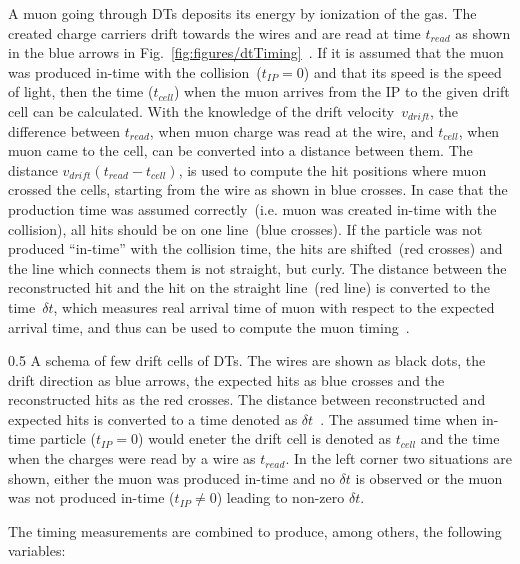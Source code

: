 A muon going through DTs deposits its energy by ionization of the gas. The created charge carriers drift towards the wires and are read at time $t_{read}$ as shown in the blue arrows in Fig.~\ref{fig:figures/dtTiming}~\cite{Traczyk:1365029}. If it is assumed that the muon was produced in-time with the collision~($t_{IP} = 0$) and that its speed is the speed of light, then the time ($t_{cell}$) when the muon arrives from the IP to the given drift cell can be calculated. With the knowledge of the drift velocity~$v_{drift}$, the difference between $t_{read}$, when muon charge was read at the wire, and $t_{cell}$, when muon came to the cell, can be converted into a distance between them. The distance $ v_{drift} (t_{read} - t_{cell})$,  is used to compute the hit positions where muon crossed the cells, starting from the wire as shown in blue crosses. In case that the production time was assumed correctly~(i.e. muon was created in-time with the collision), all hits should be on one line~(blue crosses). If the particle was not produced ``in-time'' with the collision time, the hits are shifted~(red crosses) and the line which connects them is not straight, but curly. The distance between the reconstructed hit and the hit on the straight line~(red line) is converted to the time~$\delta t$, which measures real arrival time of muon with respect to the expected arrival time, and thus can be used to compute the muon timing~\cite{Traczyk:1365029}.


                 {0.5}       %
                 { A schema of few drift cells of DTs. The wires are shown as black dots, the drift direction as blue arrows, the expected hits as blue crosses and the reconstructed hits as the red crosses. The distance between reconstructed and expected hits is converted to a time denoted as $\delta t$~\cite{Traczyk:1365029}. The assumed time when in-time particle ($t_{IP} = 0$) would eneter the drift cell is denoted as $t_{cell}$ and the time when the charges were read by a wire as $t_{read}$. In the left corner two situations are shown, either the muon was produced in-time and no $\delta t$ is observed or the muon was not produced in-time ($t_{IP} \neq 0$) leading to non-zero $\delta t$. }

The timing measurements are combined to produce, among others, the following variables: 

